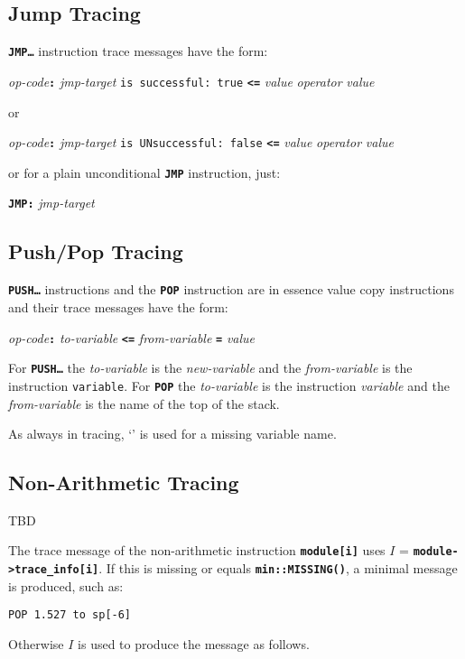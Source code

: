 \documentclass[12pt]{article}
\newcommand{\TT}[1]{{\tt \bfseries #1}}
\newcommand{\EOL}{\penalty \exhyphenpenalty}
\begin{document}
\subsection{Jump Tracing}
\label{JUMP-TRACING}

\TT{JMP\ldots} instruction trace messages have the form:

\begin{center}
{\em op-code}\TT{:} {\em jmp-target} {\tt is successful:~true}
                    \TT{<=} {\em value} {\em operator} {\em value}
\end{center}
or
\begin{center}
{\em op-code}\TT{:} {\em jmp-target} {\tt is UNsuccessful:~false}
                    \TT{<=} {\em value} {\em operator} {\em value}
\end{center}

or for a plain unconditional \TT{JMP} instruction, just:
\begin{center}
\TT{JMP:} {\em jmp-target}
\end{center}

\subsection{Push/Pop Tracing}
\label{PUSH/POP-TRACING}

\TT{PUSH\ldots} instructions and the \TT{POP} instruction are in essence
value copy instructions and their trace messages
have the form:

\begin{center}
{\em op-code}\TT{:} {\em to-variable}
                    \TT{<=} {\em from-variable} \TT{=} {\em value}
\end{center}

For \TT{PUSH\ldots} the {\em to-variable} is the {\em new-variable}
and the {\em from-variable} is the instruction {\tt variable}.
For \TT{POP} the {\em to-variable} is the instruction {\em variable}
and the {\em from-variable} is the name of the top of the stack.

As always in tracing, `\TT{*}' is used for a missing variable name.


\subsection{Non-Arithmetic Tracing}
\label{NON-ARITHMETIC-TRACING}

TBD

The trace message of the non-arithmetic instruction
\TT{module[i]} uses
$I$ = \TT{module->\EOL trace\_\EOL info[i]}.  If this is missing
or equals \TT{min::MISSING()}, a minimal message
is produced, such as:
\begin{center}
\tt POP 1.527 to sp[-6]
\end{center}
Otherwise $I$ is used to produce the message as follows.
\end{document}
